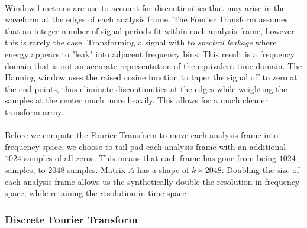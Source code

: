 \documentclass[12pt,letterpaper]{article}
\begin{document}
\paragraph*{}Window functions are use to account for discontinuities that may arise in the waveform at the edges of each analysis frame. The Fourier Transform assumes that an integer number of signal periods fit within each analysis frame, however this is rarely the case. Transforming a signal with to \textit{spectral leakage} where energy appears to "leak" into adjacent frequency bins. This result is a frequency domain that is not an accurate representation of the equivalent time domain. The Hanning window uses the raised cosine function to taper the signal off to zero at the end-points, thus eliminate discontinuities at the edges while weighting the samples at the center much more heavily. This allows for a much cleaner transform array.

\paragraph*{}Before we compute the Fourier Transform to move each analysis frame into frequency-space, we choose to tail-pad each analysis frame with an additional $1024$ samples of all zeros. This means that each frame has gone from being $1024$ samples, to $2048$ samples. Matrix $\widetilde{A}$ has a shape of $k \times 2048$. Doubling the size of each analysis frame allows us the synthetically double the resolution in frequency-space, while retaining the resolution in time-space \cite{Virtanen}. 


\subsubsection{Discrete Fourier Transform}
\label{subsubsec-DFT}
\end{document}
